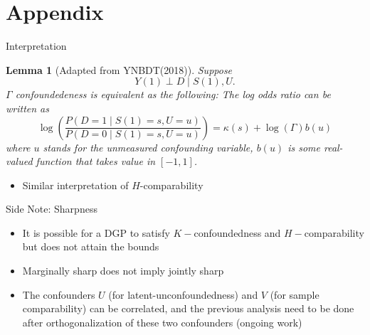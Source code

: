 \documentclass{beamer}					%
\newtheorem{lem}{Lemma}
\begin{document}
\section{Appendix}

\begin{frame}{Interpretation}
    \begin{lem}[Adapted from YNBDT(2018)]
            Suppose $$Y(1) \perp D \mid S(1), U.$$
            $\Gamma$ confoundedeness is equivalent as the following:
                The log odds ratio can be written as $$\log \left(\frac{P(D=1 \mid S(1) = s, U=u)}{P(D=0 \mid S(1)=s, U=u)}\right)=\kappa(s)+\log (\Gamma) b(u)$$
                where $u$ stands for the unmeasured confounding variable, $b(u)$ is some real-valued function that takes value in $[-1,1]$.
        \end{lem}
        \begin{itemize}
            \item Similar interpretation of $H$-comparability
        \end{itemize}
\end{frame}

\begin{frame}{Side Note: Sharpness}
    \begin{itemize}
        \item It is possible for a DGP to satisfy $K-$confoundedness and $H-$comparability but does not attain the bounds
        \item Marginally sharp does {\color{red} not} imply jointly sharp
        \item The confounders $U$ (for latent-unconfoundedness) and $V$ (for sample comparability) can be correlated, and the previous analysis need to be done after orthogonalization of these two confounders (ongoing work)
    \end{itemize}
\end{frame}
\end{document}
